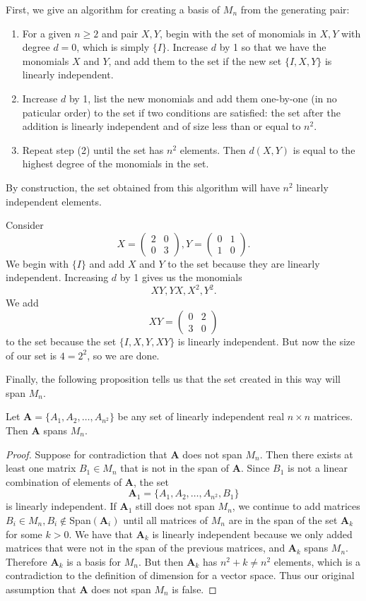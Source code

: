First, we give an algorithm for creating a basis of $M_n$ from the generating pair: 
\begin{enumerate}
    \item For a given $n\geq2$ and pair $X,Y$, begin with the set of monomials in $X,Y$ with degree $d=0$, which is simply $\{I\}$. Increase $d$ by 1 so that we have the monomials $X$ and $Y$, and add them to the set if the new set $\{I,X,Y\}$ is linearly independent.  
    \item Increase $d$ by 1, list the new monomials and add them one-by-one (in no paticular order) to the set if two conditions are satisfied: the set after the addition is linearly independent and of size less than or equal to $n^2$.  
    \item Repeat step (2) until the set has $n^2$ elements. Then $d(X,Y)$ is equal to the highest degree of the monomials in the set. 
\end{enumerate}
By construction, the set obtained from this algorithm will have $n^2$ linearly independent elements. 
\begin{example}
Consider $$X=\begin{pmatrix}2&0\\0&3\end{pmatrix}, Y=\begin{pmatrix}0&1\\1&0\end{pmatrix}.$$ We begin with $\{I\}$ and add $X$ and $Y$ to the set because they are linearly independent. Increasing $d$ by 1 gives us the monomials $$XY,YX,X^2,Y^2.$$ We add $$XY=\begin{pmatrix}0&2\\3&0\end{pmatrix}$$ to the set because the set $\{I,X,Y,XY\}$ is linearly independent. But now the size of our set is $4=2^2$, so we are done. 
\end{example}
Finally, the following proposition tells us that the set created in this way will span $M_n$.  
\begin{proposition}
Let $\textbf{A}=\{A_1,A_2,\ldots,A_{n^2}\}$ be any set of linearly independent real $n\times n$ matrices. Then $\textbf{A}$ spans $M_n$. 
\end{proposition}
\begin{proof}
Suppose for contradiction that $\textbf{A}$ does not span $M_n$. Then there exists at least one matrix $B_1\in M_n$ that is not in the span of $\textbf{A}$. Since $B_1$ is not a linear combination of elements of $\textbf{A}$, the set $$\textbf{A}_1=\{A_1,A_2,\ldots,A_{n^2},B_1\}$$ is linearly independent. If $\textbf{A}_1$ still does not span $M_n$, we continue to add matrices $B_i\in M_n, B_i\notin$Span$(\textbf{A}_i)$ until all matrices of $M_n$ are in the span of the set $\textbf{A}_k$ for some $k>0$. We have that $\textbf{A}_k$ is linearly independent because we only added matrices that were not in the span of the previous matrices, and $\textbf{A}_k$ spans $M_n$. Therefore $\textbf{A}_k$ is a basis for $M_n$. But then $\textbf{A}_k$ has $n^2+k\neq n^2$ elements, which is a contradiction to the definition of dimension for a vector space. Thus our original assumption that $\textbf{A}$ does not span $M_n$ is false. 
\end{proof}
